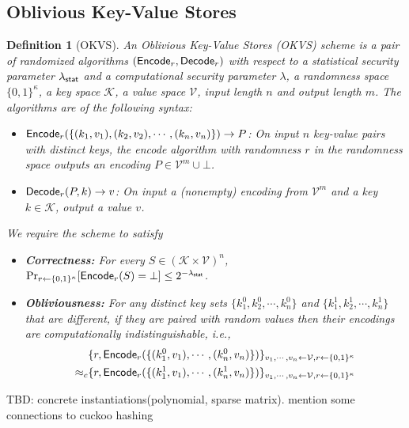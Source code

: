 \documentclass[sigconf]{acmart}
\newcommand{\Encode}{{\sf Encode}}
\newcommand{\Decode}{{\sf Decode}}
\newtheorem{definition}[theorem]{Definition}
\begin{document}
\subsection{Oblivious Key-Value Stores}
\begin{definition}[OKVS\cite{cryptoeprint:2021/883,cryptoeprint:2022/320}]
  An Oblivious Key-Value Stores (OKVS) scheme is a pair of randomized algorithms $(\Encode_r,\Decode_r)$ with respect to a statistical security parameter $\lambda_{\sf stat}$ and a computational security parameter $\lambda$, a randomness space $\{0,1\}^\kappa$, a key space $\mathcal{K}$, a value space $\mathcal{V}$, input length $n$ and output length $m$. The algorithms are of the following syntax: 
  \begin{itemize}
    \item $\Encode_r(\{(k_1,v_1),(k_2,v_2),\cdots,(k_n,v_n)\})\rightarrow P$: On input $n$ key-value pairs with distinct keys, the encode algorithm with randomness $r$ in the randomness space outputs an encoding $P\in\mathcal{V}^m\cup\bot$.
    \item $\Decode_r(P,k)\rightarrow v$: On input a (nonempty) encoding from $\mathcal{V}^m$ and a key $k\in\mathcal{K}$, output a value $v$. 
  \end{itemize}
  We require the scheme to satisfy
  \begin{itemize}
    \item \textbf{Correctness: }For every $S\in(\mathcal{K}\times\mathcal{V})^n$, $\Pr_{r\leftarrow\{0,1\}^\kappa}[\Encode_r(S)=\bot]\le 2^{-\lambda_{\sf stat}}$. 
    \item \textbf{Obliviousness: }For any distinct key sets $\{k_1^0,k_2^0,\cdots,k_n^0\}$ and $\{k_1^1,k_2^1,\cdots,k_n^1\}$ that are different, if they are paired with random values then their encodings are computationally indistinguishable, i.e., 
  \begin{align*}
    &\{r, \Encode_r(\{(k_1^0,v_1),\cdots,(k_n^0,v_n)\})\}_{v_1,\cdots,v_n\leftarrow \mathcal{V},r\leftarrow\{0,1\}^\kappa}\\
    \approx_c &\{r, \Encode_r(\{(k_1^1,v_1),\cdots,(k_n^1,v_n)\})\}_{v_1,\cdots,v_n\leftarrow \mathcal{V},r\leftarrow\{0,1\}^\kappa}
  \end{align*}
    
  \end{itemize}
\end{definition}
TBD: concrete instantiations(polynomial, sparse matrix). mention some connections to cuckoo hashing
\end{document}
